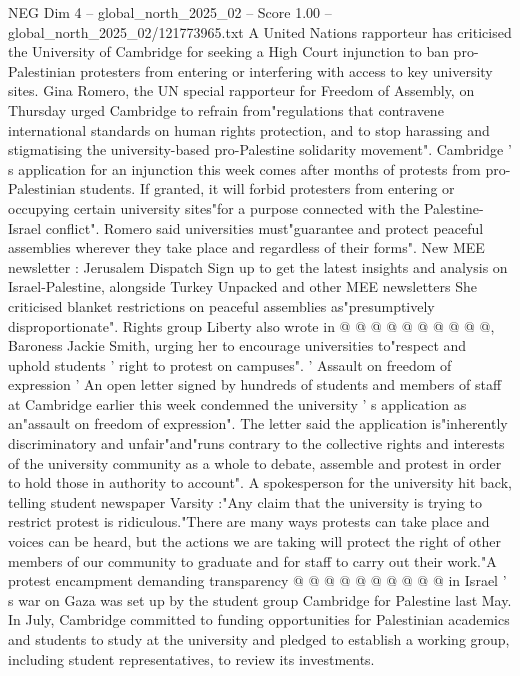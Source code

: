\begin{textsample}{NEG Dim 4 – global\_north\_2025\_02 – Score 1.00 – global\_north\_2025\_02/121773965.txt}  \label{ex:f4_neg_407}
A United Nations rapporteur has criticised the University of Cambridge for seeking a High Court injunction to ban pro-Palestinian protesters from entering or interfering with access to key university sites.
Gina Romero, the UN special rapporteur for Freedom of Assembly, on Thursday urged Cambridge to refrain from"regulations that contravene international standards on human rights protection, and to stop harassing and stigmatising the university-based pro-Palestine solidarity movement".
Cambridge ' s application for an injunction this week comes after months of protests from pro-Palestinian students.
If granted, it will forbid protesters from entering or occupying certain university sites"for a purpose connected with the Palestine-Israel conflict".
Romero said universities must"guarantee and protect peaceful assemblies wherever they take place and regardless of their forms".
New MEE newsletter : Jerusalem Dispatch Sign up to get the latest insights and analysis on Israel-Palestine, alongside Turkey Unpacked and other MEE newsletters She criticised blanket restrictions on peaceful assemblies as"presumptively disproportionate".
Rights group Liberty also wrote in @ @ @ @ @ @ @ @ @ @, Baroness Jackie Smith, urging her to encourage universities to"respect and uphold students ' right to protest on campuses". ' Assault on freedom of expression ' An open letter signed by hundreds of students and members of staff at Cambridge earlier this week condemned the university ' s application as an"assault on freedom of expression".
The letter said the application is"inherently discriminatory and unfair"and"runs contrary to the collective rights and interests of the university community as a whole to debate, assemble and protest in order to hold those in authority to account".
A spokesperson for the university hit back, telling student newspaper Varsity :"Any claim that the university is trying to restrict protest is ridiculous."There are many ways protests can take place and voices can be heard, but the actions we are taking will protect the right of other members of our community to graduate and for staff to carry out their work."A protest encampment demanding transparency @ @ @ @ @ @ @ @ @ @ in Israel ' s war on Gaza was set up by the student group Cambridge for Palestine last May.
In July, Cambridge committed to funding opportunities for Palestinian academics and students to study at the university and pledged to establish a working group, including student representatives, to review its investments.

\end{textsample}
